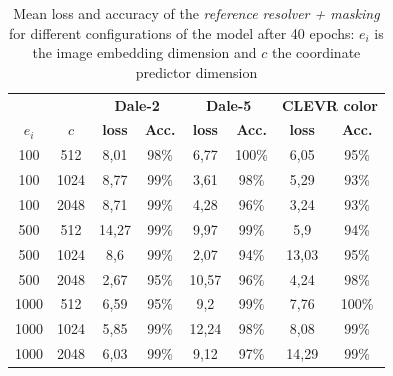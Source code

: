 \begin{table}[ht]
    \centering
    \begin{tabular}{cc|cc|cc|cc}
        \toprule
               &        & \multicolumn{2}{c}{\textbf{Dale-2}} & \multicolumn{2}{c}{\textbf{Dale-5}} & \multicolumn{2}{c}{\textbf{CLEVR color}}                                                 \\  \cmidrule(lr){3-4}\cmidrule(lr){5-6}\cmidrule(lr){7-8}
        $e_i$  & $c$    & \textbf{loss}                       & \textbf{Acc.}                       & \textbf{loss}                            & \textbf{Acc.} & \textbf{loss} & \textbf{Acc.} \\\midrule
        {100}  & {512}  & {8,01}                              & {98\%}                              & {6,77}                                   & {100\%}       & {6,05}        & {95\%}        \\
        {100}  & {1024} & {8,77}                              & {99\%}                              & {3,61}                                   & {98\%}        & {5,29}        & {93\%}        \\
        {100}  & {2048} & {8,71}                              & {99\%}                              & {4,28}                                   & {96\%}        & {3,24}        & {93\%}        \\
        {500}  & {512}  & {14,27}                             & {99\%}                              & {9,97}                                   & {99\%}        & {5,9}         & {94\%}        \\
        {500}  & {1024} & {8,6}                               & {99\%}                              & {2,07}                                   & {94\%}        & {13,03}       & {95\%}        \\
        {500}  & {2048} & {2,67}                              & {95\%}                              & {10,57}                                  & {96\%}        & {4,24}        & {98\%}        \\
        {1000} & {512}  & {6,59}                              & {95\%}                              & {9,2}                                    & {99\%}        & {7,76}        & {100\%}       \\
        {1000} & {1024} & {5,85}                              & {99\%}                              & {12,24}                                  & {98\%}        & {8,08}        & {99\%}        \\
        {1000} & {2048} & {6,03}                              & {99\%}                              & {9,12}                                   & {97\%}        & {14,29}       & {99\%}        \\
        \bottomrule
    \end{tabular}
    \caption{Mean loss and accuracy of the \emph{reference resolver + masking} for different configurations of the model after 40 epochs: $e_i$ is the image embedding dimension and $c$ the coordinate predictor dimension}
    \label{tab:results:reference-resolver-masked}
\end{table}

